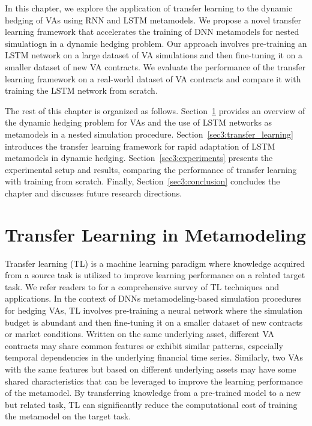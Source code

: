 In this chapter, we explore the application of transfer learning to the dynamic hedging of VAs using RNN and LSTM metamodels.
We propose a novel transfer learning framework that accelerates the training of DNN metamodels for nested simulatiogn in a dynamic hedging problem.
Our approach involves pre-training an LSTM network on a large dataset of VA simulations and then fine-tuning it on a smaller dataset of new VA contracts.
We evaluate the performance of the transfer learning framework on a real-world dataset of VA contracts and compare it with training the LSTM network from scratch.

The rest of this chapter is organized as follows.
Section~\ref{sec3:background} provides an overview of the dynamic hedging problem for VAs and the use of LSTM networks as metamodels in a nested simulation procedure.
Section~\ref{sec3:transfer_learning} introduces the transfer learning framework for rapid adaptation of LSTM metamodels in dynamic hedging.
Section~\ref{sec3:experiments} presents the experimental setup and results, comparing the performance of transfer learning with training from scratch.
Finally, Section~\ref{sec3:conclusion} concludes the chapter and discusses future research directions.

\section{Transfer Learning in Metamodeling} \label{sec3:background}

Transfer learning (TL) is a machine learning paradigm where knowledge acquired from a source task is utilized to improve learning performance on a related target task.
We refer readers to \cite{pan2009survey} for a comprehensive survey of TL techniques and applications.
In the context of DNNs metamodeling-based simulation procedures for hedging VAs, TL involves pre-training a neural network where the simulation budget is abundant and then fine-tuning it on a smaller dataset of new contracts or market conditions.
Written on the same underlying asset, different VA contracts may share common features or exhibit similar patterns, especially temporal dependencies in the underlying financial time series.
Similarly, two VAs with the same features but based on different underlying assets may have some shared characteristics that can be leveraged to improve the learning performance of the metamodel.
By transferring knowledge from a pre-trained model to a new but related task, TL can significantly reduce the computational cost of training the metamodel on the target task.

